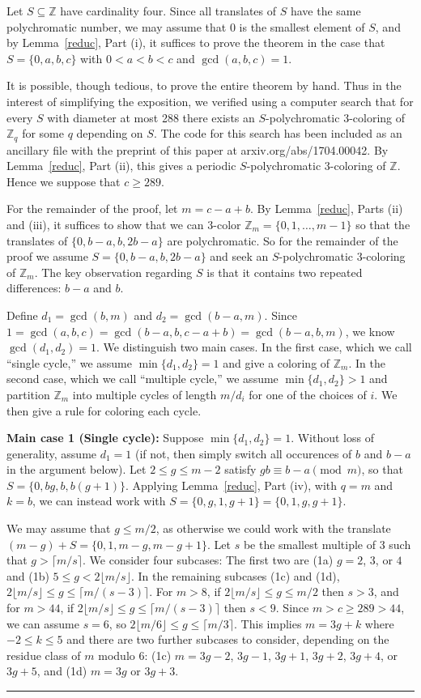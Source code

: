 \documentclass[12pt]{article}
\newenvironment{proofof}[1]{{\bf Proof of #1:  }}{\hfill\rule{2mm}{2mm}}
\newcommand{\Z}{\ensuremath{\mathbb Z}}
\begin{document}
\begin{proofof}{Theorem~\ref{ps34}}
Let $S \subseteq \Z$ have cardinality four.  Since all translates of $S$ have the same polychromatic number, we may assume that 0 is the smallest element of $S$, and by Lemma~\ref{reduc}, Part (i), it suffices to prove the theorem in the case that $S=\{0,a,b,c\}$ with $0<a<b<c$ and $\gcd(a,b,c)=1$.

It is possible, though tedious, to prove the entire theorem by hand.  Thus in the interest of simplifying the exposition, we verified using a computer search that for every $S$ with diameter at most 288 there exists an $S$-polychromatic 3-coloring of $\Z_q$ for some $q$ depending on $S$.  The code for this search has been included as an ancillary file with the preprint of this paper at arxiv.org/abs/1704.00042.  By Lemma~\ref{reduc}, Part (ii), this gives a periodic $S$-polychromatic 3-coloring of $\Z$.  Hence we suppose that $c \geq 289$. 

For the remainder of the proof, let $m=c-a+b$. By Lemma~\ref{reduc}, Parts (ii) and (iii), it suffices to show that we can 3-color $\Z_m= \{0,1,\ldots,m-1\}$ so that the translates of $\{0,b-a,b,2b-a\}$ are polychromatic.  So for the remainder of the proof we assume $S=\{0,b-a,b,2b-a\}$ and seek an $S$-polychromatic 3-coloring of $\Z_m$. The key observation regarding $S$ is that it contains two repeated differences: $b-a$ and $b$.

Define $d_1=\gcd(b,m)$ and $d_2=\gcd(b-a,m)$. Since $1=\gcd(a,b,c)=\gcd(b-a,b,c-a+b) = \gcd(b-a, b, m)$, we know $\gcd(d_1,d_2)=1$. We distinguish two main cases. In the first case, which we call ``single cycle,'' we assume $\min\{d_1,d_2\}=1$ and give a coloring of $\Z_m$. In the second case, which we call ``multiple cycle,'' we assume $\min\{d_1,d_2\}>1$ and partition $\Z_m$ into multiple cycles of length $m/d_i$ for one of the choices of $i$.  We then give a rule for coloring each cycle.

\textbf{Main case 1 (Single cycle):}  Suppose $\min\{d_1,d_2\}=1$. Without loss of generality, assume $d_1=1$ (if not, then simply switch all occurences of $b$ and $b-a$ in the argument below).  Let $2\leq g \le m-2$ satisfy $gb \equiv b-a \pmod{m}$, so that $S = \{0,bg,b,b(g+1)\}$.
Applying Lemma~\ref{reduc}, Part (iv), with $q=m$ and $k=b$, we can instead work with $S = \{0,g,1,g+1\} = \{0,1,g,g+1\}$.
 
We may assume that $g\leq m/2$, as otherwise we could work with the translate $(m-g)+S =\{0,1, m-g, m-g+1\}$. Let $s$ be the smallest multiple of 3 such that $g>\lceil m/s\rceil$. We consider four subcases:  The first two are (1a) $g=2$, $3$, or $4$ and (1b) $5 \le g<2\lfloor m/s \rfloor$. In the remaining subcases (1c) and (1d), $2\lfloor m/s\rfloor\leq g \leq \lceil m/(s-3)\rceil$. For $m >8$, if $2\lfloor m/s\rfloor\leq g\leq m/2$ then $s >3$, and for $m > 44$, if $2\lfloor m/s\rfloor\leq g \leq \lceil m/(s-3)\rceil$ then $s<9$.  Since $m > c \ge 289 > 44$, we can assume $s=6$, so $2\lfloor m/6\rfloor\leq g \leq \lceil m/3\rceil$. This implies $m=3g+k$ where $-2 \le k \le 5$ and there are two further subcases to consider, depending on the residue class of $m$ modulo 6: (1c)  $m=3g-2$, $3g-1$, $3g+1$, $3g+2$, $3g+4$, or $3g+5$, and (1d) $m=3g$ or $3g+3$.


\end{proofof}
\end{document}
